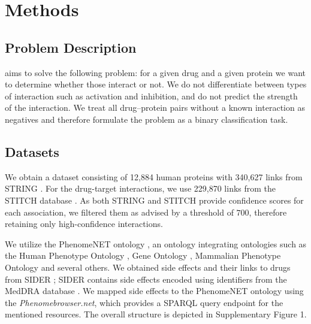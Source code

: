 \documentclass{bioinfo}
\renewcommand{\cite}{\citep}
\begin{document}



\enlargethispage{12pt}

\section{Methods}
\subsection{Problem Description}
\name{} aims to solve the following problem: for a given drug and a
given protein we want to determine whether those interact or not.  We
do not differentiate between types of interaction such as activation
and inhibition, and do not predict the strength of the interaction.
We treat all drug--protein pairs without a known interaction as
negatives and therefore formulate the problem as a binary
classification task.

\subsection{Datasets}
We obtain a dataset consisting of 12,884 human proteins with 
340,627 links from STRING \citep{STRINGv10}. For the drug-target
interactions, we use 229,870 links from the STITCH database
\citep{STITCHv5}. As both STRING and STITCH provide confidence scores
for each association, we filtered them as advised by a threshold of
$700$, therefore retaining only high-confidence interactions.

We utilize the PhenomeNET ontology \citep{PhenomeNET2011}, an ontology
integrating ontologies such as the Human Phenotype Ontology
\citep{HPO2018}, Gene Ontology \cite{GOoriginal2000, GOrecent2020},
Mammalian Phenotype Ontology \citep{MP2009} and several others.  We
obtained side effects and their links to drugs from SIDER
\citep{SIDER}; SIDER contains side effects encoded using identifiers
from the MedDRA database \citep{MedDRA}. We mapped side effects to the
PhenomeNET ontology using the \textit{Phenomebrowser.net}, which
provides a SPARQL query endpoint for the mentioned resources. The overall structure is depicted in Supplementary Figure 1.
\end{document}
